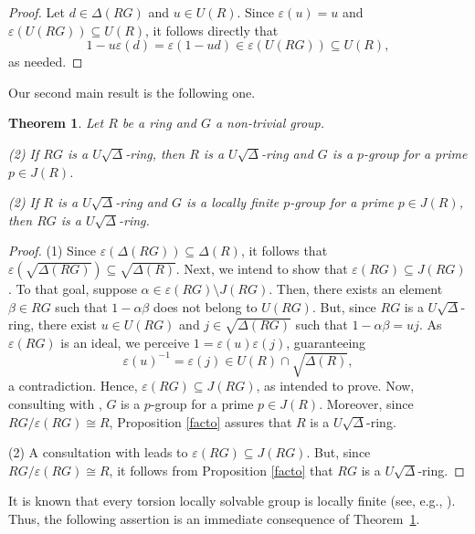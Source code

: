 \documentclass[11pt]{amsart}
\newtheorem{theorem}{Theorem}[section]
\theoremstyle{definition}
\begin{document}
\begin{proof}
Let \( d \in \Delta(RG) \) and \( u \in U(R) \). Since \(\varepsilon(u) = u\) and \(\varepsilon(U(RG)) \subseteq U(R)\), it follows directly that
	\[
	1 - u \varepsilon(d) = \varepsilon(1 - u d) \in \varepsilon(U(RG)) \subseteq U(R),
	\]
as needed.
\end{proof}

Our second main result is the following one.

\begin{theorem}\label{group ring}
Let $R$ be a ring and $G$ a non-trivial group.

(2) If $RG$ is a $U\sqrt{\Delta}$-ring, then $R$ is a $U\sqrt{\Delta}$-ring and $G$ is a $p$-group for a prime $p \in J(R)$.

(2) If $R$ is a $U\sqrt{\Delta}$-ring and $G$ is a locally finite $p$-group for a prime $p \in J(R)$, then $RG$ is a $U\sqrt{\Delta}$-ring.
\end{theorem}

\begin{proof}
(1) Since $\varepsilon(\Delta(RG)) \subseteq \Delta(R)$, it follows that $\varepsilon(\sqrt{\Delta(RG)}) \subseteq \sqrt{\Delta(R)}$. Next, we intend to show that $\varepsilon(RG) \subseteq J(RG)$. To that goal, suppose $\alpha \in \varepsilon(RG) \setminus J(RG)$. Then, there exists an element $\beta \in RG$ such that $1-\alpha\beta$ does not belong to $U(RG)$. But, since $RG$ is a $U\sqrt{\Delta}$-ring, there exist $u \in U(RG)$ and $j \in \sqrt{\Delta(RG)}$ such that $1-\alpha\beta = uj$. As $\varepsilon(RG)$ is an ideal, we perceive $1 = \varepsilon(u)\varepsilon(j)$, guaranteeing $$\varepsilon(u)^{-1} = \varepsilon(j) \in U(R) \cap \sqrt{\Delta(R)},$$ a contradiction. Hence, $\varepsilon(RG) \subseteq J(RG)$, as intended to prove. Now, consulting with \cite[Proposition~15(i)]{con}, $G$ is a $p$-group for a prime $p \in J(R)$. Moreover, since $RG/\varepsilon(RG) \cong R$, Proposition \ref{facto} assures that $R$ is a $U\sqrt{\Delta}$-ring.

(2) A consultation with \cite[Lemma~2]{zhouclean} leads to $\varepsilon(RG) \subseteq J(RG)$. But, since $RG/\varepsilon(RG) \cong R$, it follows from Proposition \ref{facto} that $RG$ is a $U\sqrt{\Delta}$-ring.
\end{proof}


It is known that every torsion locally solvable group is locally finite (see, e.g., \cite[Theorem~5.4.11]{Robinson}). Thus, the following assertion is an immediate consequence of Theorem~\ref{group ring}.
\end{document}
